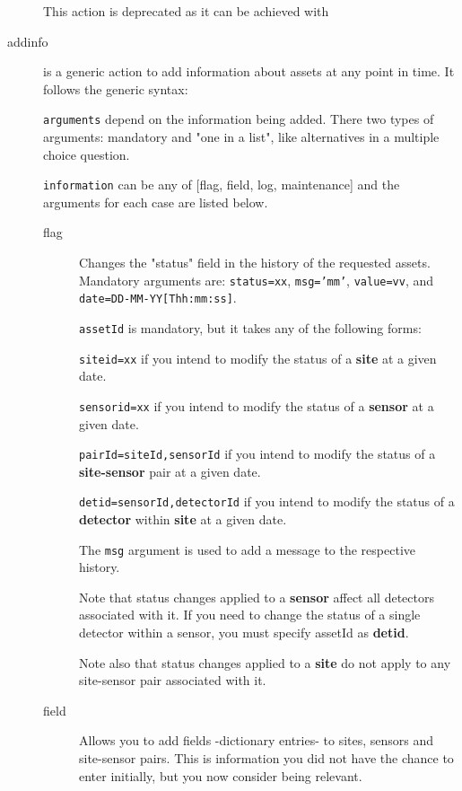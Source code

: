 \documentclass[12pt]{amsart}
\begin{document}
\begin{description}
This action is deprecated as it can be achieved with 


\item[addinfo] is a generic action to add information about assets at any point in time. It follows the generic syntax:


{\tt arguments} depend on the information being added. There two types of arguments: mandatory and "one in a list", like alternatives in a multiple choice question.

{\tt information} can be any of [flag, field, log, maintenance] and the arguments for each case are listed below.

\begin{description}
\item[flag] Changes the "status" field in the history of the requested assets. Mandatory arguments are: {\tt status=xx}, {\tt msg='mm'},  {\tt value=vv}, and\\
 {\tt date=DD-MM-YY[Thh:mm:ss]}. 

{\tt assetId} is mandatory, but it takes any of the following forms: 

{\tt siteid=xx} if you intend to modify the status of a {\bf site} at a given date.

{\tt sensorid=xx} if you intend to modify the status of a {\bf sensor} at a given date.

{\tt pairId=siteId,sensorId} if you intend to modify the status of a {\bf site-sensor} pair at a given date.

{\tt detid=sensorId,detectorId} if you intend to modify the status of a {\bf detector} within {\bf site} at a given date.

The {\tt msg} argument is used to add a message to the respective history.

Note that status changes applied to a {\bf sensor} affect all detectors associated with it. If you need to change the status of a single detector within a sensor, you must specify  assetId as {\bf detid}.

Note also that status changes applied to a {\bf site} do not apply to any site-sensor pair associated with it.

\item[field] Allows you to add fields -dictionary entries- to sites, sensors and site-sensor pairs. This is information you did not have the chance to enter initially, but you now consider being relevant.


\end{description}
\end{description}
\end{document}
